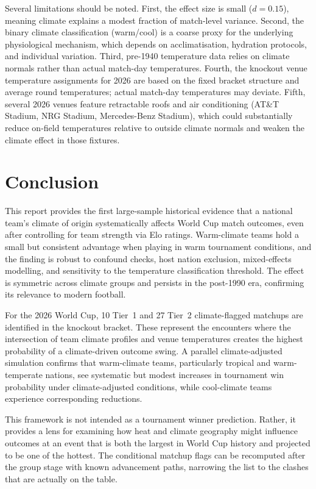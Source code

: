 \documentclass[11pt,a4paper]{article}
\begin{document}
Several limitations should be noted. First, the effect size is small ($d=0.15$), meaning climate explains a modest fraction of match-level variance. Second, the binary climate classification (warm/cool) is a coarse proxy for the underlying physiological mechanism, which depends on acclimatisation, hydration protocols, and individual variation. Third, pre-1940 temperature data relies on climate normals rather than actual match-day temperatures. Fourth, the knockout venue temperature assignments for 2026 are based on the fixed bracket structure and average round temperatures; actual match-day temperatures may deviate. Fifth, several 2026 venues feature retractable roofs and air conditioning (AT\&T Stadium, NRG Stadium, Mercedes-Benz Stadium), which could substantially reduce on-field temperatures relative to outside climate normals and weaken the climate effect in those fixtures.

\newpage

\section{Conclusion}

This report provides the first large-sample historical evidence that a national team's climate of origin systematically affects World Cup match outcomes, even after controlling for team strength via Elo ratings. Warm-climate teams hold a small but consistent advantage when playing in warm tournament conditions, and the finding is robust to confound checks, host nation exclusion, mixed-effects modelling, and sensitivity to the temperature classification threshold. The effect is symmetric across climate groups and persists in the post-1990 era, confirming its relevance to modern football.

For the 2026 World Cup, 10 Tier~1 and 27 Tier~2 climate-flagged matchups are identified in the knockout bracket. These represent the encounters where the intersection of team climate profiles and venue temperatures creates the highest probability of a climate-driven outcome swing. A parallel climate-adjusted simulation confirms that warm-climate teams, particularly tropical and warm-temperate nations, see systematic but modest increases in tournament win probability under climate-adjusted conditions, while cool-climate teams experience corresponding reductions.

This framework is not intended as a tournament winner prediction. Rather, it provides a lens for examining how heat and climate geography might influence outcomes at an event that is both the largest in World Cup history and projected to be one of the hottest. The conditional matchup flags can be recomputed after the group stage with known advancement paths, narrowing the list to the clashes that are actually on the table.
\end{document}
